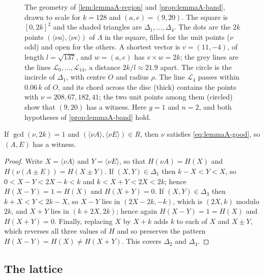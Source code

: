 \begin{figure}
\caption{The geometry of \autoref{lem:lemmaA-region} and
\autoref{prop:lemmaA-band}, drawn to scale for $k=128$ and $(a,e)=(9,20)$.
The square is $[0,2k]^2$ and the shaded triangles are $\Delta_1,\dots,\Delta_4$. The
dots are the $2k$ points $(\langle \nu a\rangle,\langle \nu e\rangle)$ of
$\Lambda$ in the square, filled for the unit points ($\nu$ odd) and open for
the others. A shortest vector is $v=(11,-4)$, of length $l=\sqrt{137}$, and
$w=(a,e)$ has $v\times w=2k$; the grey lines are the lines
$\mathcal L_0,\dots,\mathcal L_{14}$, a distance $2k/l\approx21.9$ apart. The circle is the
incircle of $\Delta_1$, with centre $O$ and radius $\rho$. The line $\mathcal L_4$ passes
within $0.06\,k$ of $O$, and its chord across the disc (thick) contains
the points with $\nu=208,67,182,41$; the two unit points among them (circled)
show that $(9,20)$ has a witness. Here $g=1$ and $n=2$, and both hypotheses of
\autoref{prop:lemmaA-band} hold.}
\label{fig:lemmaA-geometry}
\end{figure}

\begin{lemma}
\label{lem:lemmaA-region}
If $\gcd(\nu,2k)=1$ and $(\langle \nu A\rangle,\langle \nu E\rangle)\in R$, then
$\nu$ satisfies \eqref{eq:lemmaA-good}, so $(A,E)$ has a witness.
\end{lemma}

\begin{proof}
Write $X=\langle \nu A\rangle$ and $Y=\langle \nu E\rangle$, so that
$H(\nu A)=H(X)$ and $H(\nu(A\pm E))=H(X\pm Y)$. If $(X,Y)\in \Delta_1$ then
$k-X<Y<X$, so $0<X-Y<2X-k<k$ and $k<X+Y<2X<2k$; hence
$H(X-Y)=1=H(X)$ and $H(X+Y)=0$. If $(X,Y)\in \Delta_3$ then $k+X<Y<2k-X$, so
$X-Y$ lies in $(2X-2k,-k)$, which is $(2X,k)$ modulo $2k$, and $X+Y$ lies in
$(k+2X,2k)$; hence again $H(X-Y)=1=H(X)$ and $H(X+Y)=0$. Finally, replacing
$X$ by $X+k$ adds $k$ to each of $X$ and $X\pm Y$, which reverses all three
values of $H$ and so preserves the pattern $H(X-Y)=H(X)\ne H(X+Y)$. This
covers $\Delta_2$ and $\Delta_4$.
\end{proof}

\subsection{The lattice}

